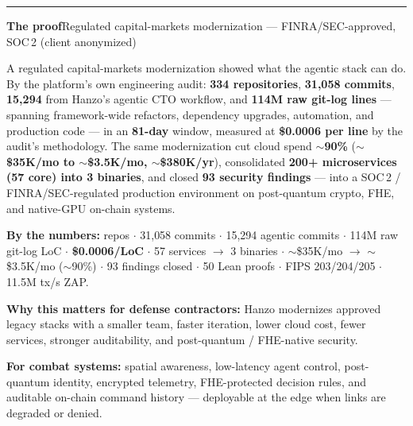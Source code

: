 \documentclass[9pt,letterpaper]{extarticle}
\newcommand{\rulen}{\textcolor{hzrule}{\rule{\linewidth}{0.7pt}}}
\begin{document}
\vspace{2pt}\rulen\vspace{3pt}

{\large\textbf{The proof}}\quad\textcolor{hzgray}{\footnotesize Regulated capital-markets modernization --- FINRA/SEC-approved, SOC\,2 (client anonymized)}

\vspace{2pt}
A regulated capital-markets modernization showed what the agentic stack can do. By the platform's own engineering
audit: \textbf{334 repositories}, \textbf{31{,}058 commits}, \textbf{15{,}294} from Hanzo's agentic CTO workflow,
and \textbf{114M raw git-log lines} --- spanning framework-wide refactors, dependency upgrades, automation, and
production code --- in an \textbf{81-day} window, measured at \textbf{\$0.0006 per line} by the audit's
methodology. The same modernization cut cloud spend \textbf{$\sim$90\%} (\textbf{$\sim$\$35K/mo to $\sim$\$3.5K/mo,
$\sim$\$380K/yr}), consolidated \textbf{200+ microservices (57 core) into 3 binaries}, and closed
\textbf{93 security findings} --- into a
SOC\,2 / FINRA/SEC-regulated production environment on post-quantum crypto, FHE, and native-GPU on-chain systems.

\vspace{4pt}
{\footnotesize\textcolor{hzgray}{\textbf{By the numbers:}} repos $\cdot$ 31{,}058 commits $\cdot$ 15{,}294 agentic commits $\cdot$ 114M raw git-log LoC $\cdot$
\textbf{\$0.0006/LoC} $\cdot$ 57 services $\rightarrow$ 3 binaries $\cdot$ $\sim$\$35K/mo $\rightarrow$ $\sim$\$3.5K/mo ($\sim$90\%)
$\cdot$ 93 findings closed $\cdot$ 50 Lean proofs $\cdot$ FIPS 203/204/205 $\cdot$ 11.5M tx/s ZAP.}

\vspace{3pt}
\textbf{Why this matters for defense contractors:} Hanzo modernizes approved legacy stacks with a smaller team,
faster iteration, lower cloud cost, fewer services, stronger auditability, and post-quantum / FHE-native security.

\vspace{5pt}
\colorbox{hzblack}{\parbox{\dimexpr\linewidth-2\fboxsep}{\color{white}\small
\textbf{For combat systems:} spatial awareness, low-latency agent control, post-quantum identity, encrypted
telemetry, FHE-protected decision rules, and auditable on-chain command history --- deployable at the edge when
links are degraded or denied.}}
\end{document}
